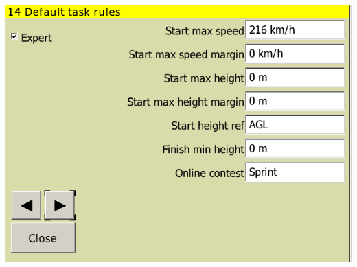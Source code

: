 \documentclass[a4paper,12pt]{refrep}
\begin{document}
\begin{center}
\includegraphics[angle=0,width=\linewidth,keepaspectratio='true']{figures/config-12.png}
\end{center}
\end{document}
